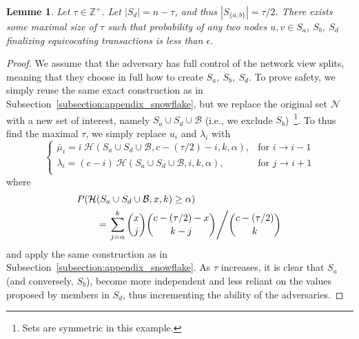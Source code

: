 \documentclass[letterpaper,twocolumn,10pt]{article}
\newtheorem{lemma}[theorem]{Lemme}
\theoremstyle{definition}
\begin{document}
\begin{appendices}
{\begin{lemma}
Let $\tau \in \mathbb{Z}^{+}$. Let $|S_d| = n - \tau$, and thus $|S_{\{a, b\}}| = \tau/2$. There exists some maximal size of $\tau$ such that probability of any two nodes $u, v \in S_a,\ S_b,\ S_d$ finalizing equivocating transactions is less than $\epsilon$. 
\end{lemma}
\begin{proof}
We assume that the adversary has full control of the network view splits, meaning that they choose in full how to create $S_a,\ S_b,\ S_d$. To prove safety, we simply reuse the same exact construction as in Subsection~\ref{subsection:appendix_snowflake}, but we replace the original set $\mathcal{N}$ with a new set of interest, namely $S_a \cup S_d \cup \mathcal{B}$ (i.e., we exclude $S_b$)~\footnote{Sets are symmetric in this example.}. To thus find the maximal $\tau$, we simply replace $u_i$ and $\lambda_i$ with 
\begin{equation}
    \begin{cases}
        \bar \mu_i = i\ \mathcal{H}(S_a \cup S_d \cup \mathcal{B}, c-(\tau/2)-i, k, \alpha), & \text{for } i \rightarrow i - 1 \\
        \lambda_i = (c-i)\ \mathcal{H}(S_a \cup S_d \cup \mathcal{B}, i, k, \alpha), & \text{for } j \rightarrow i + 1 \\
    \end{cases}
\end{equation}
where
\begin{equation}
\begin{split}
P(\mathcal{H}&(S_a \cup S_d \cup \mathcal{B}, x, k) \geq \alpha)\\
&= \left.\sum_{j = \alpha}^{k} {x \choose j}{c-(\tau/2)-x \choose k-j}\middle/{c - (\tau/2) \choose k}\right.\\
\end{split}
\end{equation}
and apply the same construction as in Subsection~\ref{subsection:appendix_snowflake}. As $\tau$ increases, it is clear that $S_a$ (and conversely, $S_b$), become more independent and less reliant on the values proposed by members in $S_d$, thus incrementing the ability of the adversaries. 
\end{proof}


}



\end{appendices}
\end{document}
